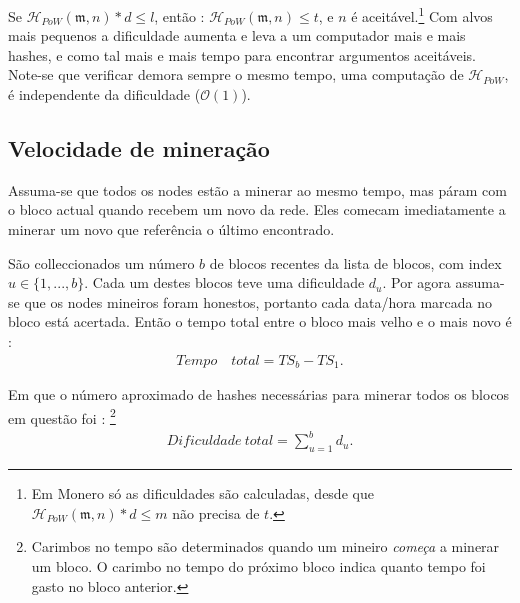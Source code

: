 Se 
 $\mathcal{H}_{PoW}(\mathfrak{m},n)*d \leq l$, então : $\mathcal{H}_{PoW}(\mathfrak{m},n) \leq t$, e $n$ é aceitável.\footnote{Em Monero só as dificuldades são calculadas, desde que $\mathcal{H}_{PoW}(\mathfrak{m},n)*d \leq m$ não precisa de $t$.}
Com alvos mais pequenos a dificuldade aumenta e leva a um computador mais e mais hashes, e como tal mais e mais tempo para encontrar argumentos aceitáveis. Note-se que verificar demora sempre o mesmo tempo, uma computação de $\mathcal{H}_{PoW}$, é independente da dificuldade ($\mathcal{O}(1)$).

\subsection{Velocidade de mineração}
Assuma-se que todos os nodes estão a minerar ao mesmo tempo, mas páram com o bloco actual quando recebem um novo da rede. Eles comecam imediatamente a minerar um novo que referência o último encontrado. 


São colleccionados um número $b$ de blocos recentes da lista de blocos, com index $u \in \{1,...,b\}$. Cada um destes blocos teve uma dificuldade $d_u$. Por agora assuma-se que os nodes mineiros foram honestos, portanto cada data/hora marcada no bloco está acertada. Então o tempo total entre o bloco mais velho e o mais novo é : 
\begin{align*}
Tempo\hspace{1em}total = {TS}_b - {TS}_1 .  
\end{align*}

Em que o número aproximado de hashes necessárias para minerar todos os blocos em questão foi :
\footnote{Carimbos no tempo são determinados quando um mineiro {\em começa} a minerar um bloco. O carimbo no tempo do próximo bloco indica quanto tempo foi gasto no bloco anterior.}
\begin{align*}
Dificuldade\ total = \sum_{u=1}^b d_u .
\end{align*}


